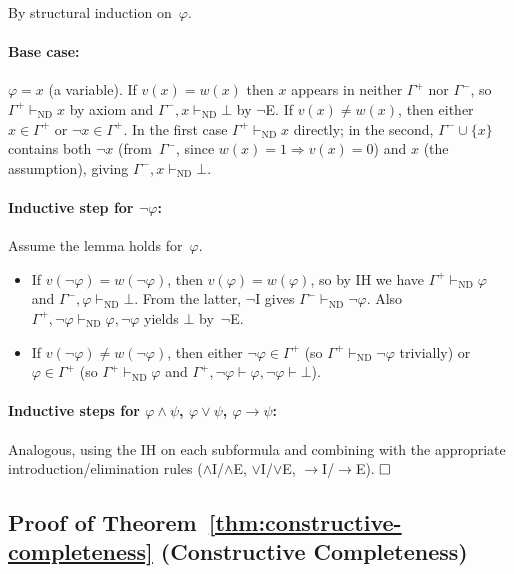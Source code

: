 \documentclass[conference]{IEEEtran}
\newcommand{\proves}{\vdash}
\begin{document}
By structural induction on~$\varphi$.

\paragraph{Base case:} $\varphi = x$ (a variable).
If $v(x) = w(x)$ then $x$ appears in neither $\Gamma^+$ nor $\Gamma^-$,
so $\Gamma^+ \proves_{\mathrm{ND}} x$ by axiom and
$\Gamma^-, x \proves_{\mathrm{ND}} \bot$ by $\neg$E.
If $v(x) \neq w(x)$, then either $x \in \Gamma^+$ or
$\neg x \in \Gamma^+$.  In the first case $\Gamma^+ \proves_{\mathrm{ND}} x$
directly; in the second, $\Gamma^- \cup \{x\}$ contains both
$\neg x$ (from~$\Gamma^-$, since $w(x)=1 \Rightarrow v(x)=0$)
and $x$ (the assumption), giving $\Gamma^-, x \proves_{\mathrm{ND}} \bot$.

\paragraph{Inductive step for $\neg\varphi$:}
Assume the lemma holds for~$\varphi$.
\begin{itemize}
  \item If $v(\neg\varphi) = w(\neg\varphi)$, then
    $v(\varphi) = w(\varphi)$, so by IH we have
    $\Gamma^+ \proves_{\mathrm{ND}} \varphi$ and
    $\Gamma^-, \varphi \proves_{\mathrm{ND}} \bot$.
    From the latter, $\neg$I gives
    $\Gamma^- \proves_{\mathrm{ND}} \neg\varphi$.
    Also $\Gamma^+, \neg\varphi \proves_{\mathrm{ND}} \varphi, \neg\varphi$
    yields $\bot$ by~$\neg$E.

  \item If $v(\neg\varphi) \neq w(\neg\varphi)$, then either
    $\neg\varphi \in \Gamma^+$ (so $\Gamma^+ \proves_{\mathrm{ND}} \neg\varphi$
    trivially) or $\varphi \in \Gamma^+$ (so
    $\Gamma^+ \proves_{\mathrm{ND}} \varphi$ and
    $\Gamma^+, \neg\varphi \vdash \varphi, \neg\varphi \vdash \bot$).
\end{itemize}

\paragraph{Inductive steps for $\varphi \wedge \psi$,
  $\varphi \vee \psi$, $\varphi \to \psi$:}
Analogous, using the IH on each subformula and combining with the
appropriate introduction/elimination rules ($\wedge$I/$\wedge$E,
$\vee$I/$\vee$E, $\to$I/$\to$E).  $\hfill\square$

\subsection{Proof of Theorem~\ref{thm:constructive-completeness}
  (Constructive Completeness)}
\end{document}
